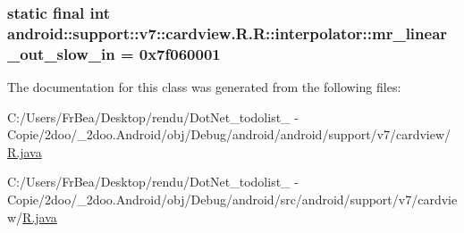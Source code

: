 \hypertarget{classandroid_1_1support_1_1v7_1_1cardview_1_1_r_1_1interpolator_a96184caaf87dd672c889d8949599fd2}{
\subsubsection[{mr\_\-linear\_\-out\_\-slow\_\-in}]{\setlength{\rightskip}{0pt plus 5cm}static final int android::support::v7::cardview.R.R::interpolator::mr\_\-linear\_\-out\_\-slow\_\-in = 0x7f060001}}
\label{classandroid_1_1support_1_1v7_1_1cardview_1_1_r_1_1interpolator_a96184caaf87dd672c889d8949599fd2}




The documentation for this class was generated from the following files:\begin{CompactItemize}
\item 
C:/Users/FrBea/Desktop/rendu/DotNet\_\-todolist\_ - Copie/2doo/\_\-2doo.Android/obj/Debug/android/android/support/v7/cardview/\hyperlink{android_2support_2v7_2cardview_2_r_8java}{R.java}\item 
C:/Users/FrBea/Desktop/rendu/DotNet\_\-todolist\_ - Copie/2doo/\_\-2doo.Android/obj/Debug/android/src/android/support/v7/cardview/\hyperlink{src_2android_2support_2v7_2cardview_2_r_8java}{R.java}\end{CompactItemize}
